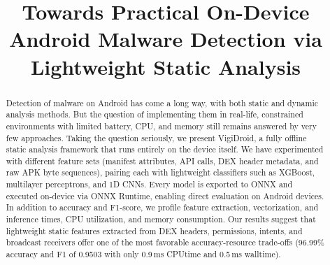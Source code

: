 \documentclass[conference]{IEEEtran}
\begin{document}
	
	\title{Towards Practical On-Device Android Malware Detection via Lightweight Static Analysis}
	
	\author{
		
		\and
		
		\and
		
		\and
		\and
	}
	
	
	
	\maketitle
	
	\begin{abstract}
		Detection of malware on Android has come a long way, with both static and dynamic analysis methods.
		But the question of implementing them in real-life, constrained environments with limited battery, CPU, and memory still remains answered by very few approaches.
		Taking the question seriously, we present VigiDroid, a fully offline static analysis framework that runs entirely on the device itself.
		We have experimented with different feature sets (manifest attributes, API calls, DEX header metadata, and raw APK byte sequences), pairing each with lightweight classifiers such as XGBoost, multilayer perceptrons, and 1D CNNs.
		Every model is exported to ONNX and executed on-device via ONNX Runtime, enabling direct evaluation on Android devices.
		In addition to accuracy and F1-score, we profile feature extraction, vectorization, and inference times, CPU utilization, and memory consumption.
		Our results suggest that lightweight static features extracted from DEX headers, permissions, intents, and broadcast receivers offer one of the most favorable accuracy-resource trade-offs (96.99\% accuracy and F1 of 0.9503 with only 0.9\,ms CPUtime and 0.5\,ms walltime).
	\end{abstract}
	
\end{document}
